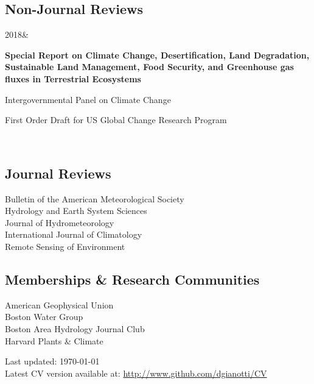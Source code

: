 \documentclass[]{friggeri-cv}
\newcommand{\lpdentry}[4]{\begin{entrylist}%
   #1&\begin{minipage}[t]{11.8cm}%
   \begin{minipage}[t]{11.8cm-0.4cm-\widthof{\begin{varwidth}{4cm} \footnotesize#3 \strut\end{varwidth}}
}\strut \raggedright\textbf{#2} \strut\end{minipage}\hfill\begin{varwidth}[t]{4cm} \footnotesize\addfontfeature{Color=lightgray}\begin{flushright}#3 \strut\end{flushright}\end{varwidth}\vspace{0.6\parsep}
  
    {\tnr\begin{hangparas}{0.25in}{1} #4\vspace{3\parsep}\end{hangparas}}%
  \end{minipage}\\\end{entrylist}}
\begin{document}
\subsection{Non-Journal Reviews}
	\lpdentry
		{2018} 
		{Special Report on Climate Change, Desertification, Land Degradation, Sustainable Land 
		Management, Food Security, and Greenhouse gas fluxes in Terrestrial Ecosystems}
		{Intergovernmental Panel on Climate Change}
		{First Order Draft for US Global Change Research Program}

\subsection{Journal Reviews}
Bulletin of the American Meteorological Society\\
Hydrology and Earth System Sciences\\
Journal of Hydrometeorology\\
International Journal of Climatology\\
Remote Sensing of Environment

\subsection{Memberships \& Research Communities}
American Geophysical Union\\ %
Boston Water Group\\ %
Boston Area Hydrology Journal Club\\ %
Harvard Plants \& Climate

\vfill{}

\begin{flushright}
{\scriptsize  Last updated: \today \\
Latest CV version available at: \href{http://www.github.com/dgianotti/CV}{http://www.github.com/dgianotti/CV}}
\end{flushright}
\end{document}
